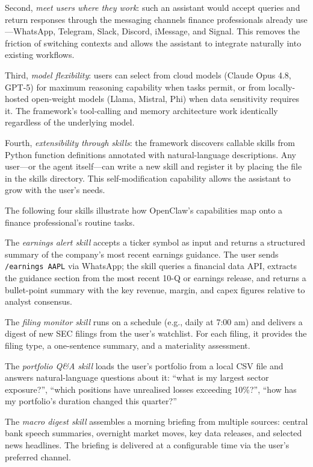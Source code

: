 \begin{context}
Second, \emph{meet users where they work}: such an assistant would accept queries and return responses through the messaging channels finance professionals already use---WhatsApp, Telegram, Slack, Discord, iMessage, and Signal. This removes the friction of switching contexts and allows the assistant to integrate naturally into existing workflows.

Third, \emph{model flexibility}: users can select from cloud models (Claude Opus 4.8, GPT-5) for maximum reasoning capability when tasks permit, or from locally-hosted open-weight models (Llama, Mistral, Phi) when data sensitivity requires it. The framework's tool-calling and memory architecture work identically regardless of the underlying model.

Fourth, \emph{extensibility through skills}: the framework discovers callable skills from Python function definitions annotated with natural-language descriptions. Any user---or the agent itself---can write a new skill and register it by placing the file in the skills directory. This self-modification capability allows the assistant to grow with the user's needs.

\begin{example}
\label{ex:openclaw-skills}
The following four skills illustrate how OpenClaw's capabilities map onto a finance professional's routine tasks.

The \emph{earnings alert skill} accepts a ticker symbol as input and returns a structured summary of the company's most recent earnings guidance. The user sends \texttt{/earnings AAPL} via WhatsApp; the skill queries a financial data API, extracts the guidance section from the most recent 10-Q or earnings release, and returns a bullet-point summary with the key revenue, margin, and capex figures relative to analyst consensus.

The \emph{filing monitor skill} runs on a schedule (e.g., daily at 7:00 am) and delivers a digest of new SEC filings from the user's watchlist. For each filing, it provides the filing type, a one-sentence summary, and a materiality assessment.

The \emph{portfolio Q\&A skill} loads the user's portfolio from a local CSV file and answers natural-language questions about it: ``what is my largest sector exposure?'', ``which positions have unrealised losses exceeding 10\%?'', ``how has my portfolio's duration changed this quarter?''

The \emph{macro digest skill} assembles a morning briefing from multiple sources: central bank speech summaries, overnight market moves, key data releases, and selected news headlines. The briefing is delivered at a configurable time via the user's preferred channel.
\end{example}


\end{context}
